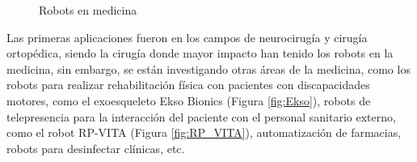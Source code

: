  \begin{figure}[H]
    \begin{center}
      \subcapcentertrue
      \hspace{5mm}
      \hspace{10mm}
    \end{center}
    \caption{Robots en medicina}
    \label{fig:Robots_medicos}
  \end{figure}

Las primeras aplicaciones fueron en los campos de neurocirugía y cirugía ortopédica, siendo la cirugía donde mayor impacto han tenido los robots en la medicina, %
sin embargo, se están investigando otras áreas de la medicina, como los robots para realizar rehabilitación física con pacientes con discapacidades motores, como el exoesqueleto Ekso Bionics (Figura \ref{fig:Ekso}), robots de telepresencia para la interacción del paciente con el personal sanitario externo, como el robot RP-VITA (Figura \ref{fig:RP_VITA}), automatización de farmacias, robots para desinfectar clínicas, etc. \cite{Dupont21}

